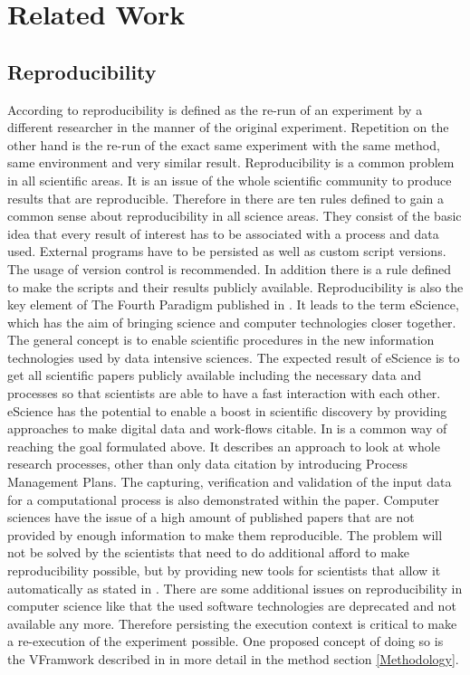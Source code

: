 \documentclass[draft,final]{vutinfth} %
\begin{document}
\chapter{Related Work}\label{Related Work}


\section{Reproducibility}\label{Reproducibility}
According to \cite{6064509} reproducibility is defined as the re-run of an experiment by a different researcher in the manner of the original experiment. Repetition on the other hand is the re-run of the exact same experiment with the same method, same environment and very similar result. 
Reproducibility is a common problem in all scientific areas. It is an issue of the whole scientific community to produce results that are reproducible. Therefore in \cite{10.1371/journal.pcbi.1003285} there are ten rules defined to gain a common sense about reproducibility in all science areas. They consist of the basic idea that every result of interest has to be associated with a process and data used. External programs have to be persisted as well as custom script versions. The usage of version control is recommended. In addition there is a rule defined to make the scripts and their results publicly available. \cite{10.1371/journal.pcbi.1003285} 
Reproducibility is also the key element of The Fourth Paradigm published in \cite{noauthororeditorfourth}. It leads to the term eScience, which has the aim of bringing science and computer technologies closer together. The general concept is to enable scientific procedures in the new information technologies used by data intensive sciences. The expected result of eScience is to get all scientific papers publicly available including the necessary data and processes so that scientists are able to have a fast interaction with each other. \cite{noauthororeditorfourth}
eScience has the potential to enable a boost in scientific discovery by providing approaches to make digital data and work-flows citable. In \cite{Rauber2015RepeatabilityAR} is a common way of reaching the goal formulated above. It describes an approach to look at whole research processes, other than only data citation by introducing Process Management Plans. The capturing, verification and validation of the input data for a computational process is also demonstrated within the paper.\cite{Rauber2015RepeatabilityAR}
Computer sciences have the issue of a high amount of published papers that are not provided by enough information to make them reproducible. The problem will not be solved by the scientists that need to do additional afford to make reproducibility possible, but by providing new tools for scientists that allow it automatically as stated in \cite{MIKSA201725}. There are some additional issues on reproducibility in computer science like that the used software technologies are deprecated and not available any more. Therefore persisting the execution context is critical to make a re-execution of the experiment possible. One proposed concept of doing so is the VFramwork described in in more detail in the method section \ref{Methodology}.
\end{document}
